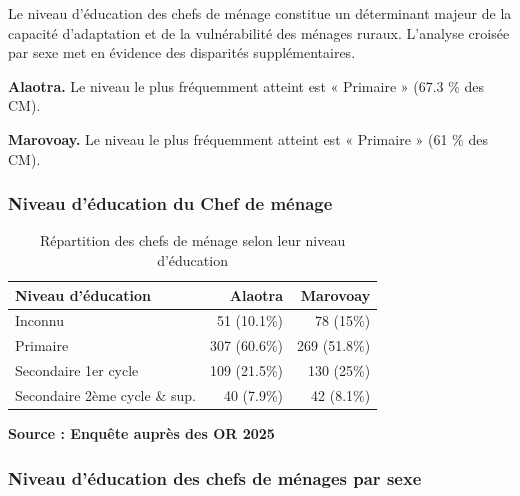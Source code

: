 \documentclass[
  french,
  letterpaper,
]{report}
\begin{document}
Le niveau d'éducation des chefs de ménage constitue un déterminant
majeur de la capacité d'adaptation et de la vulnérabilité des ménages
ruraux. L'analyse croisée par sexe met en évidence des disparités
supplémentaires.

\textbf{Alaotra.} Le niveau le plus fréquemment atteint est « Primaire »
(67.3 \% des CM).

\textbf{Marovoay.} Le niveau le plus fréquemment atteint est « Primaire
» (61 \% des CM).

\subsubsection{Niveau d'éducation du Chef de
ménage}\label{niveau-duxe9ducation-du-chef-de-muxe9nage}

\begin{table}
\caption*{
{\fontsize{20}{25}\selectfont  Répartition des chefs de ménage selon leur niveau d'éducation\fontsize{12}{15}\selectfont }
} 
\fontsize{12.0pt}{14.0pt}\selectfont
\begin{tabular*}{\linewidth}{@{\extracolsep{\fill}}lrr}
\toprule
Niveau d'éducation & {\bfseries {Alaotra}} & {\bfseries {Marovoay}} \\ 
\midrule\addlinespace[2.5pt]
Inconnu & 51 (10.1\%) & 78 (15\%) \\ 
Primaire & 307 (60.6\%) & 269 (51.8\%) \\ 
Secondaire 1er cycle & 109 (21.5\%) & 130 (25\%) \\ 
Secondaire 2ème cycle \& sup. & 40 (7.9\%) & 42 (8.1\%) \\ 
\bottomrule
\end{tabular*}
\begin{minipage}{\linewidth}
\textbf{Source : Enquête auprès des OR 2025}\\
\end{minipage}
\end{table}

\subsubsection{Niveau d'éducation des chefs de ménages par
sexe}\label{niveau-duxe9ducation-des-chefs-de-muxe9nages-par-sexe}
\end{document}
